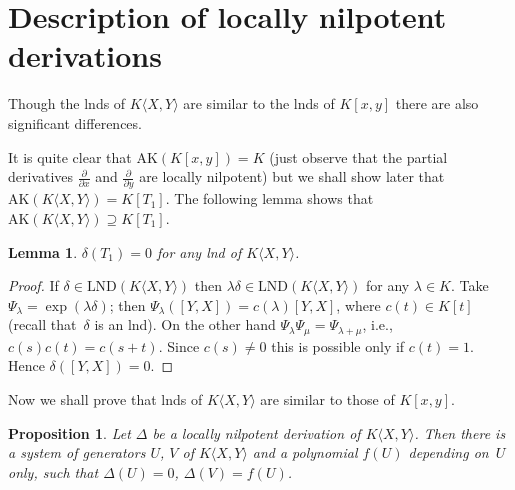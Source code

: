 \documentclass[10pt,a4paper]{amsart}
\numberwithin{equation}{section}
\newtheorem{Lemma}[Theorem]{Lemma}
\newtheorem{Proposition}[Theorem]{Proposition}
\begin{document}
\section{Description of locally nilpotent derivations}

Though the lnds of $K\langle X,Y\rangle$ are similar to the lnds of $K[x,y]$ there are also significant differences.

It is quite clear that $\text{AK}(K[x, y]) = K$ (just observe that the partial derivatives $\frac{\partial}{\partial x}$ and $\frac{\partial}{\partial y}$ are locally nilpotent)
but we shall show later that $\text{AK}(K\langle X,Y\rangle) = K[T_1]$. The following lemma shows that $\text{AK}(K\langle X,Y\rangle) \supseteq K[T_1]$.

\begin{Lemma}\label{commutator goes to 0} $\delta(T_1) = 0$ for any lnd of $K\langle X,Y\rangle$.
\end{Lemma}

\begin{proof} If $\delta \in \text{LND}(K\langle X,Y\rangle)$ then $\lambda\delta \in \text{LND}(K\langle X,Y\rangle)$ for any $\lambda \in K$. Take $\Psi_{\lambda} = \exp(\lambda\delta)$; then $\Psi_{\lambda}([Y,X]) = c(\lambda)[Y,X]$, where $c(t) \in K[t]$ (recall that~$\delta$ is an lnd). On the other hand $\Psi_{\lambda} \Psi_{\mu} = \Psi_{\lambda + \mu}$, i.e., $c(s)c(t) =c(s + t)$. Since $c(s) \ne 0$ this is possible only if $c(t) = 1$. Hence $\delta([Y,X]) = 0$.
\end{proof}

Now we shall prove that lnds of $K\langle X,Y\rangle$ are similar to those of $K[x,y]$.

\begin{Proposition}\label{similarity} Let $\Delta$ be a locally nilpotent derivation of $K\langle X,Y\rangle$. Then there is a system of generators $U$, $V$ of $K\langle X,Y\rangle$ and a polynomial $f(U)$ depending on~$U$ only, such that $\Delta(U)=0$, $\Delta(V)=f(U)$.
\end{Proposition}
\end{document}
